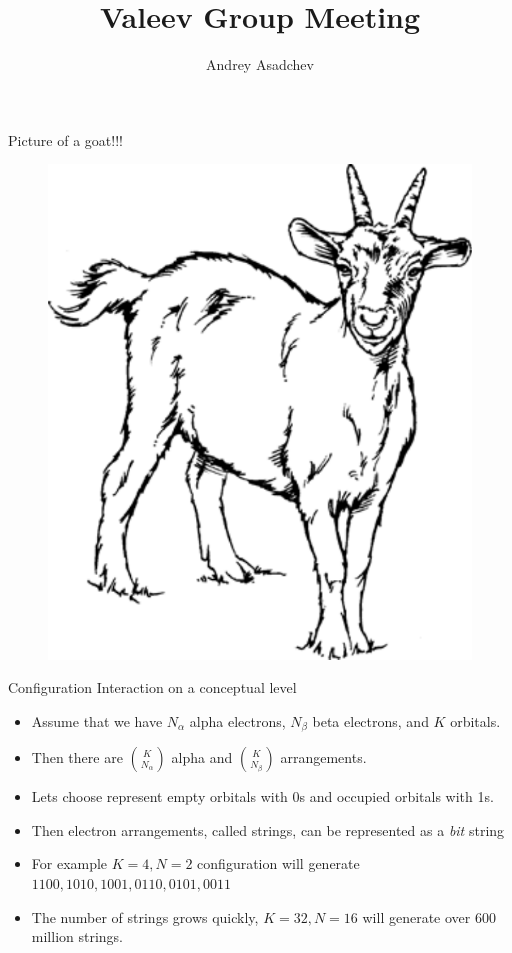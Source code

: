 \documentclass{beamer}
\title[Valeev Group Meeting]{Valeev Group Meeting}
\author{Andrey Asadchev}
\institute{VT.edu}
\begin{document}
\begin{frame}
  \titlepage
\end{frame}

\begin{frame}{Picture of a goat!!!}
\begin{figure}[here]
\begin{center}
\includegraphics[scale=0.5]{goat.pdf}
\end{center}
\end{figure}
\end{frame}

\begin{frame}{Configuration Interaction on a conceptual level}
\begin{itemize}
\item Assume that we have $N_\alpha$ alpha electrons, $N_\beta$ beta electrons, and $K$ orbitals.
\item Then there are ${K \choose N_\alpha}$ alpha and ${K \choose N_\beta}$ arrangements.
\item Lets choose represent empty orbitals with 0s and occupied orbitals with 1s.
\item Then electron arrangements, called strings, can be represented as a {\it bit} string
\item For example $K = 4, N = 2$ configuration will generate $1100, 1010, 1001, 0110, 0101, 0011$
\item The number of strings grows quickly, $K = 32, N = 16$ will generate over 600 million strings.
\end{itemize}
\end{frame}
\end{document}
